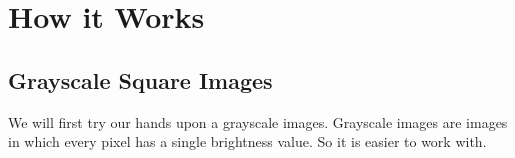 \section{How it Works}
	\subsection{Grayscale Square Images}

	We will first try our hands upon a grayscale images. Grayscale images are images in which every pixel has a single brightness value. So it is easier to work with.